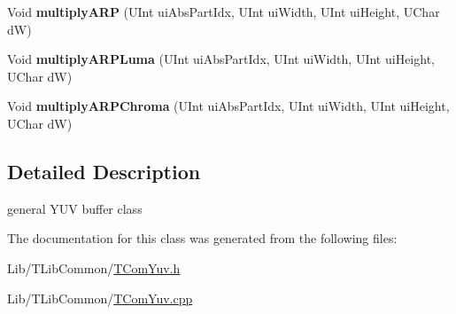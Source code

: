\begin{DoxyCompactItemize}
\item 
\mbox{\label{class_t_com_yuv_a679c8147cd88ca0edb0564993341d5f9}} 
Void {\bfseries multiply\+A\+RP} (U\+Int ui\+Abs\+Part\+Idx, U\+Int ui\+Width, U\+Int ui\+Height, U\+Char dW)
\item 
\mbox{\label{class_t_com_yuv_adc70394fcfcf012d59c6f24c7bfc10a0}} 
Void {\bfseries multiply\+A\+R\+P\+Luma} (U\+Int ui\+Abs\+Part\+Idx, U\+Int ui\+Width, U\+Int ui\+Height, U\+Char dW)
\item 
\mbox{\label{class_t_com_yuv_a670e374688cdbf3bda86f9c3e009d2e4}} 
Void {\bfseries multiply\+A\+R\+P\+Chroma} (U\+Int ui\+Abs\+Part\+Idx, U\+Int ui\+Width, U\+Int ui\+Height, U\+Char dW)
\end{DoxyCompactItemize}


\subsection{Detailed Description}
general Y\+UV buffer class 

The documentation for this class was generated from the following files\+:\begin{DoxyCompactItemize}
\item 
Lib/\+T\+Lib\+Common/\hyperlink{_t_com_yuv_8h}{T\+Com\+Yuv.\+h}\item 
Lib/\+T\+Lib\+Common/\hyperlink{_t_com_yuv_8cpp}{T\+Com\+Yuv.\+cpp}\end{DoxyCompactItemize}
